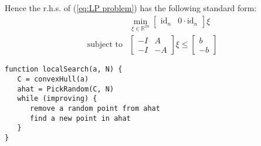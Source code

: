 \documentclass[10pt,a4paper]{article}
\newcommand{\R}{\mathbb{R}}
\newcommand{\id}{\text{id}}
\begin{document}
	Hence the r.h.s. of (\ref{eq:LP problem}) has the following standard form:
	\begin{align*}
	&\min_{\xi \in \R^{2n}} \begin{bmatrix}
	\id_{n} & 0 \cdot \id_{n}
	\end{bmatrix} \xi\\
	\text{subject to}& \begin{bmatrix}
	-I & A\\
	-I & -A
	\end{bmatrix} 
	\xi \leq 
	\begin{bmatrix}
	b\\
	-b
	\end{bmatrix}
	\end{align*}
	\begin{lstlisting}[caption={A algorithm to find a local solution},basicstyle=\small]
function localSearch(a, N) {
   C = convexHull(a)
   ahat = PickRandom(C, N)
   while (improving) {
      remove a random point from ahat
      find a new point in ahat
   }
}
	\end{lstlisting}
	
\end{document}
